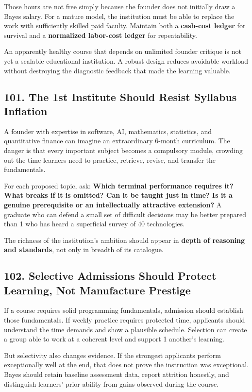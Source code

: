 Those hours are not free simply because the founder does not initially draw a Bayes salary. For a mature model, the institution must be able to replace the work with sufficiently skilled paid faculty. Maintain both a \textbf{cash-cost ledger} for survival and a \textbf{normalized labor-cost ledger} for repeatability.

An apparently healthy course that depends on unlimited founder critique is not yet a scalable educational institution. A robust design reduces avoidable workload without destroying the diagnostic feedback that made the learning valuable.

\subsection*{101. The 1st Institute Should Resist Syllabus Inflation}

A founder with expertise in software, AI, mathematics, statistics, and quantitative finance can imagine an extraordinary 6-month curriculum. The danger is that every important subject becomes a compulsory module, crowding out the time learners need to practice, retrieve, revise, and transfer the fundamentals.

For each proposed topic, ask: \textbf{Which terminal performance requires it? What breaks if it is omitted? Can it be taught just in time? Is it a genuine prerequisite or an intellectually attractive extension?} A graduate who can defend a small set of difficult decisions may be better prepared than 1 who has heard a superficial survey of 40 technologies.

The richness of the institution's ambition should appear in \textbf{depth of reasoning and standards}, not only in breadth of its catalogue.

\subsection*{102. Selective Admissions Should Protect Learning, Not Manufacture Prestige}

If a course requires solid programming fundamentals, admission should establish those fundamentals. If weekly practice requires protected time, applicants should understand the time demands and show a plausible schedule. Selection can create a group able to work at a coherent level and support 1 another's learning.

But selectivity also changes evidence. If the strongest applicants perform exceptionally well at the end, that does not prove the instruction was exceptional. Bayes should retain baseline assessment data, report attrition honestly, and distinguish learners' prior ability from gains observed during the course.

